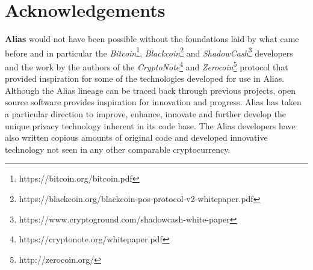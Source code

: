 \section{Acknowledgements}
\textbf{Alias} would not have been possible without the foundations
laid by what came before and in particular the
\textit{Bitcoin}\footnote{https://bitcoin.org/bitcoin.pdf},
\textit{Blackcoin}\footnote{https://blackcoin.org/blackcoin-pos-protocol-v2-whitepaper.pdf}
and
\textit{ShadowCash}\footnote{https://www.cryptoground.com/shadowcash-white-paper}
developers and the work by the authors of the
\textit{CryptoNote}\footnote{https://cryptonote.org/whitepaper.pdf}
and \textit{Zerocoin}\footnote{http://zerocoin.org/} protocol that
provided inspiration for
some of the technologies developed for use in Alias. Although the
Alias lineage can be traced back through previous projects, open
source software provides inspiration for innovation and progress.
Alias has taken a particular direction to improve, enhance,
innovate and further develop the unique privacy technology inherent
in its code base. The Alias developers have also written copious
amounts of original code and developed innovative technology not seen
in any other comparable cryptocurrency.
